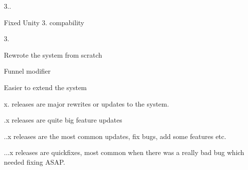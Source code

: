 \begin{DoxyItemize}
\begin{DoxyItemize}
\end{DoxyItemize}
\item 3..
\begin{DoxyItemize}
\item Fixed Unity 3. compability
\end{DoxyItemize}
\item 3.
\begin{DoxyItemize}
\item Rewrote the system from scratch
\item Funnel modifier
\item Easier to extend the system
\end{DoxyItemize}
\item x. releases are major rewrites or updates to the system.
\item .x releases are quite big feature updates
\item ..x releases are the most common updates, fix bugs, add some features etc.
\item ...x releases are quickfixes, most common when there was a really bad bug which needed fixing A\+S\+AP.
\end{DoxyItemize}